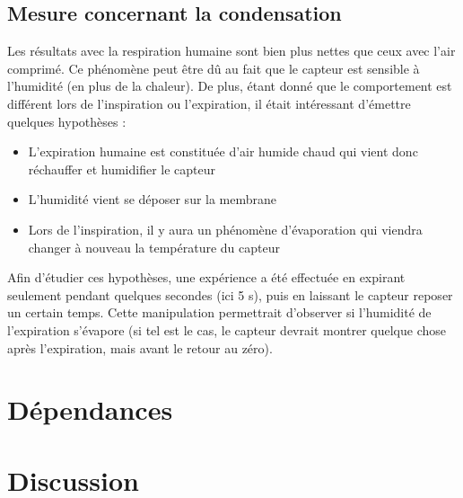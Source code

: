 \subsection{Mesure concernant la condensation}
Les résultats avec la respiration humaine sont bien plus nettes que ceux avec l'air comprimé. Ce phénomène peut être dû au fait que le capteur 
est sensible à l'humidité (en plus de la chaleur). De plus, étant donné que le comportement est différent lors de l'inspiration ou l'expiration, 
il était intéressant d'émettre quelques hypothèses :
\begin{itemize}
    \item L'expiration humaine est constituée d'air humide chaud qui vient donc réchauffer et humidifier le capteur
    \item L'humidité vient se déposer sur la membrane
    \item Lors de l'inspiration, il y aura un phénomène d'évaporation qui viendra changer à nouveau la température du capteur
\end{itemize}

Afin d'étudier ces hypothèses, une expérience a été effectuée en expirant seulement pendant quelques secondes (ici 5 s), puis en laissant le 
capteur reposer un certain temps. Cette manipulation permettrait d'observer si l'humidité de l'expiration s'évapore (si tel est le cas, le 
capteur devrait montrer quelque chose après l'expiration, mais avant le retour au zéro). 

\section{Dépendances}
\section{Discussion}

